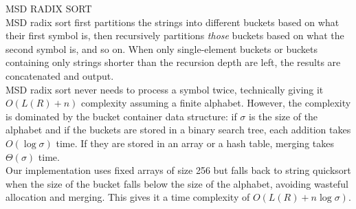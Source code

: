 {\sffamily\normalsize{\color{sciorange} MSD RADIX SORT}}\vspace{1mm}\\
\footnotesize 
MSD radix sort first partitions the strings into different buckets based on
what their first symbol is, then recursively partitions \emph{those} buckets
based on what the second symbol is, and so on.  When only single-element
buckets or buckets containing only strings shorter than the recursion depth
are left, the results are concatenated and output.\\

MSD radix sort never needs to process a symbol twice, technically giving it
$O(L(R) + n)$ complexity assuming a finite alphabet.  However, the complexity
is dominated by the bucket container data structure: if $\sigma$ is the size of the
alphabet and if the buckets are stored in a binary search tree, each addition
takes $O(\log \sigma)$ time.  If they are stored in an array or a hash table, merging
takes $\Theta(\sigma)$ time.\\

Our implementation uses fixed arrays of size 256 but falls back to string
quicksort when the size of the bucket falls below the size of the alphabet,
avoiding wasteful allocation and merging.  This gives it a time complexity
of $O(L(R) + n \log \sigma)$.
